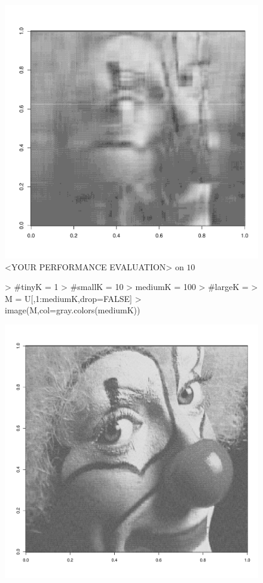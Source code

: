 \documentclass[12pt]{article}
\begin{document}
\begin{itemize}
\begin{itemize}
\begin{itemize}
\begin{figure}
\includegraphics{nhleeHW3-010}
\caption{<YOUR PERFORMANCE EVALUATION> on $10$}
    \label{fig:matlabclownKaNumber}
\end{figure}
\begin{figure}
    \centering
\begin{Schunk}
\begin{Sinput}
> #tinyK = 1
> #smallK = 10 
> mediumK = 100
> #largeK = 
> M = U[,1:mediumK,drop=FALSE] %
> image(M,col=gray.colors(mediumK))
\end{Sinput}
\end{Schunk}
\includegraphics{nhleeHW3-011}

\end{figure}
\end{itemize}
\end{itemize}
\end{itemize}
\end{document}
